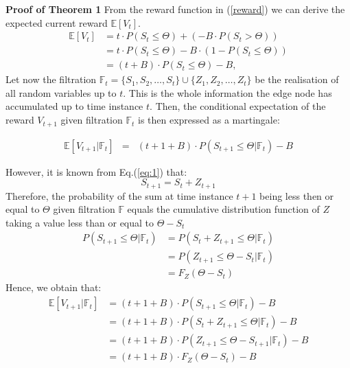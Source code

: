 \documentclass{mpaper}
\begin{document}

\textbf{Proof of Theorem 1}
From the reward function in (\ref{reward}) we can derive the expected current reward $\mathbb{E}[V_t]$. 
\begin{equation}
\begin{split}
    \mathbb{E}[V_t] & = t \cdot P(S_t \leq \Theta) + (-B \cdot P(S_t > \Theta))\\
    & = t \cdot P(S_t \leq \Theta) - B \cdot (1 - P(S_t \leq \Theta))\\
    & = (t + B) \cdot P(S_t \leq \Theta) - B,
\end{split}
\end{equation}
Let now the filtration $\mathbb{F}_{t} = \{S_{1}, S_{2}, \ldots, S_{t}\} \cup \{Z_{1}, Z_{2}, \ldots, Z_{t}\}$ be the realisation of all random variables up to $t$. This is the whole information the edge node has accumulated up to time instance $t$. 
Then, the conditional expectation of the reward $V_{t+1}$ given filtration $\mathbb{F}_{t}$ is then expressed as a martingale:

\begin{eqnarray}
    \mathbb{E}[V_{t+1}|\mathbb{F}_{t}] & = & (t + 1 + B) \cdot P(S_{t+1} \leq \Theta | \mathbb{F}_t) - B
\end{eqnarray}

However, it is known from Eq.(\ref{eq:1}) that:
\begin{equation}
    S_{t+1} = S_t + Z_{t+1}
\end{equation}
Therefore, the probability of the sum at time instance $t+1$ being less then or equal to $\Theta$ given filtration $\mathbb{F}$ equals the cumulative distribution function of $Z$ taking a value less than or equal to $\Theta - S_t$ 
\begin{align*}
    P(S_{t+1} \leq \Theta | \mathbb{F}_t) &= P(S_t + Z_{t+1} \leq \Theta| \mathbb{F}_t)\\
                           &= P(Z_{t+1}\leq\Theta-S_t| \mathbb{F}_t)\\
                           &= F_{Z}(\Theta - S_t)
\end{align*}
Hence, we obtain that:
\begin{align*}
    \mathbb{E}[V_{t+1}|\mathbb{F}_{t}] &= (t + 1 + B) \cdot P(S_{t+1} \leq \Theta | \mathbb{F}_t) - B\\
    &=(t + 1 + B) \cdot P(S_{t}+Z_{t+1} \leq \Theta | \mathbb{F}_{t}) - B\\
    &=(t + 1 + B) \cdot P(Z_{t+1} \leq \Theta-S_{t+1} | \mathbb{F}_{t}) - B\\
    &=(t + 1 + B) \cdot F_{Z}(\Theta-S_{t}) - B\\
\end{align*}
\end{document}
